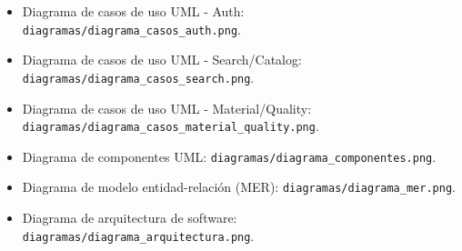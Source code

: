 \documentclass[12pt,a4paper]{article}
\begin{document}
\begin{itemize}
    \item Diagrama de casos de uso UML - Auth: \texttt{diagramas/diagrama\_casos\_auth.png}.
    \item Diagrama de casos de uso UML - Search/Catalog: \texttt{diagramas/diagrama\_casos\_search.png}.
    \item Diagrama de casos de uso UML - Material/Quality: \texttt{diagramas/diagrama\_casos\_material\_quality.png}.
    \item Diagrama de componentes UML: \texttt{diagramas/diagrama\_componentes.png}.
    \item Diagrama de modelo entidad-relación (MER): \texttt{diagramas/diagrama\_mer.png}.
    \item Diagrama de arquitectura de software: \texttt{diagramas/diagrama\_arquitectura.png}.
\end{itemize}
\end{document}

